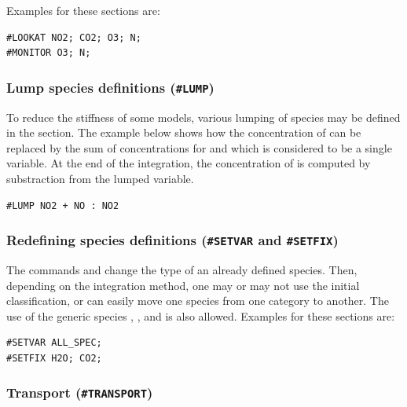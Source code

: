\documentclass[twoside]{article}
\begin{document}
Examples for these sections are:
%
\begin{verbatim}
#LOOKAT NO2; CO2; O3; N;
#MONITOR O3; N;
\end{verbatim}

\subsubsection{Lump species definitions ({\tt\#LUMP})}
\label{sec:section-lump}

To reduce the stiffness of some models, various lumping of species may
be defined in the  section. The example below shows how the
concentration of  can be replaced by the sum of
concentrations for  and  which is considered to be a
single variable. At the end of the integration, the concentration of
 is computed by substraction from the lumped variable.
%
\begin{verbatim}
#LUMP NO2 + NO : NO2
\end{verbatim}

\subsubsection{Redefining species definitions ({\tt\#SETVAR} and
  {\tt\#SETFIX})}
\label{sec:section-setvar-setfix}

The commands  and  change the type of an
already defined species. Then, depending on the integration method, one
may or may not use the initial classification, or can easily move one
species from one category to another. The use of the generic species
, , and  is also allowed.
Examples for these sections are:
%
\begin{verbatim}
#SETVAR ALL_SPEC;
#SETFIX H2O; CO2;
\end{verbatim}

\subsubsection{Transport ({\tt\#TRANSPORT})}
\label{sec:section-transport}
\end{document}
